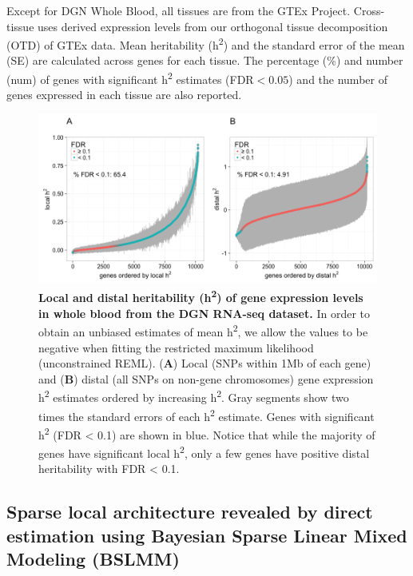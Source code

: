 \documentclass[10pt,letterpaper]{article}
\begin{document}
\begin{table}[!ht]
\begin{adjustwidth}{-2.25in}{0in}
\begin{flushleft} Except for DGN Whole Blood, all tissues are from the GTEx Project. Cross-tissue uses derived expression levels from our orthogonal tissue decomposition (OTD) of GTEx data. Mean heritability (h\textsuperscript{2}) and the standard error of the mean (SE) are calculated across genes for each tissue. The percentage (\%) and number (num) of genes with significant h\textsuperscript{2} estimates (FDR$<0.05$) and the number of genes expressed in each tissue are also reported.
\end{flushleft}
\label{table-h2}
\end{adjustwidth}
\end{table}

\clearpage

\begin{figure}[H]
\includegraphics[width=12cm]{Figures/Fig-DGN-jt-h2-UNCONSTRAINED.png}
\caption{{\bf  Local and distal heritability  (h\textsuperscript{2}) of gene expression levels in whole blood from the DGN RNA-seq dataset.} 
%
In order to obtain an unbiased estimates of mean h\textsuperscript{2}, we allow the values to be negative when fitting the restricted maximum likelihood (unconstrained REML). (\textbf{A}) Local (SNPs within 1Mb of each gene) and (\textbf{B}) distal (all SNPs on non-gene chromosomes) gene expression h\textsuperscript{2} estimates ordered by increasing h\textsuperscript{2}. Gray segments show two times the standard errors of each h\textsuperscript{2} estimate. Genes with significant h\textsuperscript{2} (FDR \textless{} 0.1) are shown in blue. Notice that while the majority of genes have significant local h\textsuperscript{2}, only a few genes have positive distal heritability with FDR \textless{} 0.1. %
}
\label{fig-dgn-jt-h2}
\end{figure}

\subsection*{Sparse local architecture revealed by direct estimation using Bayesian Sparse Linear Mixed Modeling (BSLMM)}
\end{document}
